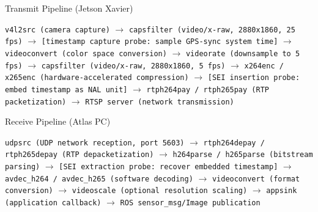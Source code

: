 \documentclass{erauthesis}
\begin{document}
\begin{algorithm}
\caption{Transmit Pipeline (Jetson Xavier)}
\begin{algorithmic}[1]
\State \texttt{v4l2src (camera capture)}
\State $\rightarrow$ \texttt{capsfilter (video/x-raw, 2880x1860, 25 fps)}
\State $\rightarrow$ \texttt{[timestamp capture probe: sample GPS-sync system time]}
\State $\rightarrow$ \texttt{videoconvert (color space conversion)}
\State $\rightarrow$ \texttt{videorate (downsample to 5 fps)}
\State $\rightarrow$ \texttt{capsfilter (video/x-raw, 2880x1860, 5 fps)}
\State $\rightarrow$ \texttt{x264enc / x265enc (hardware-accelerated compression)}
\State $\rightarrow$ \texttt{[SEI insertion probe: embed timestamp as NAL unit]}
\State $\rightarrow$ \texttt{rtph264pay / rtph265pay (RTP packetization)}
\State $\rightarrow$ \texttt{RTSP server (network transmission)}
\end{algorithmic} \label{vide_encode}
\end{algorithm}

\begin{algorithm}
\caption{Receive Pipeline (Atlas PC)}
\begin{algorithmic}[1]
\State \texttt{udpsrc (UDP network reception, port 5603)}
\State $\rightarrow$ \texttt{rtph264depay / rtph265depay (RTP depacketization)}
\State $\rightarrow$ \texttt{h264parse / h265parse (bitstream parsing)}
\State $\rightarrow$ \texttt{[SEI extraction probe: recover embedded timestamp]}
\State $\rightarrow$ \texttt{avdec\_h264 / avdec\_h265 (software decoding)}
\State $\rightarrow$ \texttt{videoconvert (format conversion)}
\State $\rightarrow$ \texttt{videoscale (optional resolution scaling)}
\State $\rightarrow$ \texttt{appsink (application callback)}
\State $\rightarrow$ \texttt{ROS sensor\_msg/Image publication}
\end{algorithmic} \label{video_decode}
\end{algorithm}
\end{document}
